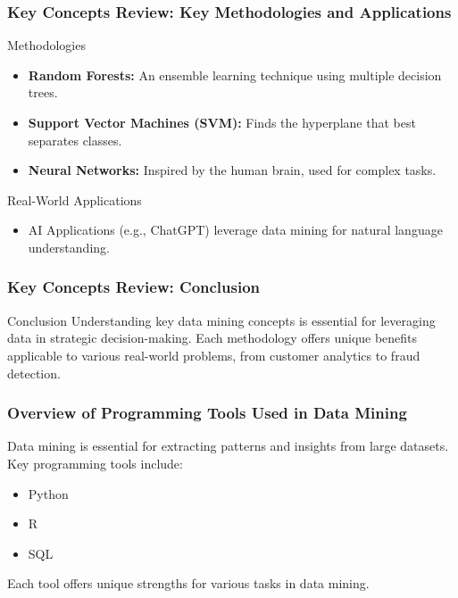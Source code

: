 \documentclass[aspectratio=169]{beamer}
\begin{document}
\begin{frame}[fragile]
  \frametitle{Key Concepts Review: Key Methodologies and Applications}
  \begin{block}{Methodologies}
    \begin{itemize}
      \item \textbf{Random Forests:} An ensemble learning technique using multiple decision trees.
      \item \textbf{Support Vector Machines (SVM):} Finds the hyperplane that best separates classes.
      \item \textbf{Neural Networks:} Inspired by the human brain, used for complex tasks.
    \end{itemize}
  \end{block}
  
  \begin{block}{Real-World Applications}
    \begin{itemize}
      \item AI Applications (e.g., ChatGPT) leverage data mining for natural language understanding.
    \end{itemize}
  \end{block}
\end{frame}

\begin{frame}[fragile]
  \frametitle{Key Concepts Review: Conclusion}
  \begin{block}{Conclusion}
    Understanding key data mining concepts is essential for leveraging data in strategic decision-making. Each methodology offers unique benefits applicable to various real-world problems, from customer analytics to fraud detection.
  \end{block}
\end{frame}

\begin{frame}
    \frametitle{Overview of Programming Tools Used in Data Mining}
    Data mining is essential for extracting patterns and insights from large datasets. Key programming tools include:
    \begin{itemize}
        \item Python
        \item R
        \item SQL
    \end{itemize}
    Each tool offers unique strengths for various tasks in data mining.
\end{frame}
\end{document}
